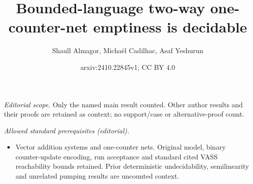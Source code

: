 \documentclass[11pt,a4paper]{amsart}
\title{Bounded-language two-way one-counter-net emptiness is decidable}
\author{Shaull Almagor, Michaël Cadilhac, Asaf Yeshurun}
\date{arxiv:2410.22845v1; CC BY 4.0}
\theoremstyle{definition}
\begin{document}
\maketitle
\noindent\textit{Editorial scope.} Only the named main result counted. Other author results and their proofs are retained as context; no support/case or alternative-proof count.\par\medskip
\noindent\textit{Allowed standard prerequisites (editorial).}\begin{itemize}
\item Vector addition systems and one-counter nets. Original model, binary counter-update encoding, run acceptance and standard cited VASS reachability bounds retained. Prior deterministic undecidability, semilinearity and unrelated pumping results are uncounted context.
\end{itemize}\medskip
\end{document}
